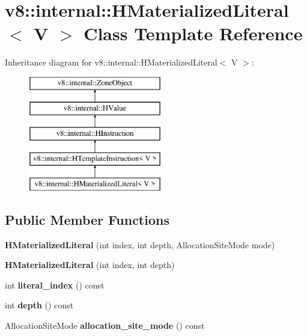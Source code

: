 \hypertarget{classv8_1_1internal_1_1_h_materialized_literal}{}\section{v8\+:\+:internal\+:\+:H\+Materialized\+Literal$<$ V $>$ Class Template Reference}
\label{classv8_1_1internal_1_1_h_materialized_literal}
Inheritance diagram for v8\+:\+:internal\+:\+:H\+Materialized\+Literal$<$ V $>$\+:\begin{figure}[H]
\begin{center}
\leavevmode
\includegraphics[height=5.000000cm]{classv8_1_1internal_1_1_h_materialized_literal}
\end{center}
\end{figure}
\subsection*{Public Member Functions}
\begin{DoxyCompactItemize}
\item 
\hypertarget{classv8_1_1internal_1_1_h_materialized_literal_ac87f4a8628c5a0be8d7d8ee8ddbb7abc}{}{\bfseries H\+Materialized\+Literal} (int index, int depth, Allocation\+Site\+Mode mode)\label{classv8_1_1internal_1_1_h_materialized_literal_ac87f4a8628c5a0be8d7d8ee8ddbb7abc}

\item 
\hypertarget{classv8_1_1internal_1_1_h_materialized_literal_a4cacf28ce2bb57506f3d4a9b01d8a1bd}{}{\bfseries H\+Materialized\+Literal} (int index, int depth)\label{classv8_1_1internal_1_1_h_materialized_literal_a4cacf28ce2bb57506f3d4a9b01d8a1bd}

\item 
\hypertarget{classv8_1_1internal_1_1_h_materialized_literal_add1b51c83730c28bfc4279fb006d078e}{}int {\bfseries literal\+\_\+index} () const \label{classv8_1_1internal_1_1_h_materialized_literal_add1b51c83730c28bfc4279fb006d078e}

\item 
\hypertarget{classv8_1_1internal_1_1_h_materialized_literal_a2fcf78dc689d6384411aa4f530230807}{}int {\bfseries depth} () const \label{classv8_1_1internal_1_1_h_materialized_literal_a2fcf78dc689d6384411aa4f530230807}

\item 
\hypertarget{classv8_1_1internal_1_1_h_materialized_literal_a310d3a231644d17083260e86e9a8d01a}{}Allocation\+Site\+Mode {\bfseries allocation\+\_\+site\+\_\+mode} () const \label{classv8_1_1internal_1_1_h_materialized_literal_a310d3a231644d17083260e86e9a8d01a}

\end{DoxyCompactItemize}
